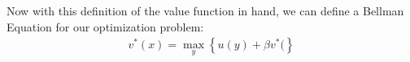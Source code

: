 \documentclass[a4paper,12pt]{scrartcl}
\begin{document}
Now with this definition of the value function in hand, we can
define a Bellman Equation for our optimization problem: 
\begin{align*}
  v^*(x) = \max_{y} \left\{ u(y) + \beta v^*( \right\}
\end{align*}










% 
\end{document}
